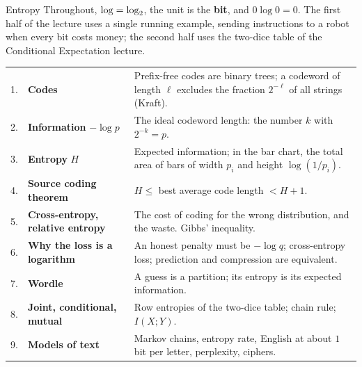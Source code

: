 \begin{frame}{Entropy}
  \small
  Throughout, $\log=\log_2$, the unit is the \textbf{bit}, and $0\log 0=0$. The first half of the lecture uses a single running example, sending instructions to a robot when every bit costs money; the second half uses the two-dice table of the Conditional Expectation lecture.
  \smallskip
  \renewcommand{\arraystretch}{1.25}
  \begin{tabular}{@{}r@{\ \ }>{\raggedright\arraybackslash}p{4.4cm}>{\raggedright\arraybackslash}p{8.6cm}@{}}
    1. & \textbf{Codes} & Prefix-free codes are binary trees; a codeword of length $\ell$ excludes the fraction $2^{-\ell}$ of all strings (Kraft). \\
    2. & \textbf{Information} $-\log p$ & The ideal codeword length: the number $k$ with $2^{-k}=p$. \\
    3. & \textbf{Entropy} $H$ & Expected information; in the bar chart, the total area of bars of width $p_i$ and height $\log(1/p_i)$. \\
    4. & \textbf{Source coding theorem} & $H\le$ best average code length $<H+1$. \\
    5. & \textbf{Cross-entropy, relative entropy} & The cost of coding for the wrong distribution, and the waste. Gibbs' inequality. \\
    6. & \textbf{Why the loss is a logarithm} & An honest penalty must be $-\log q$; cross-entropy loss; prediction and compression are equivalent. \\
    7. & \textbf{Wordle} & A guess is a partition; its entropy is its expected information. \\
    8. & \textbf{Joint, conditional, mutual} & Row entropies of the two-dice table; chain rule; $I(X;Y)$. \\
    9. & \textbf{Models of text} & Markov chains, entropy rate, English at about $1$ bit per letter, perplexity, ciphers. \\
  \end{tabular}
\end{frame}

